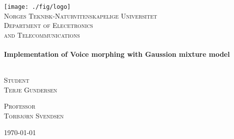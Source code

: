 \begin{titlepage}
 
\begin{center}
 
 
\texttt{[image: ./fig/logo]}\\[1cm]
 
\textsc{\LARGE Norges Teknisk-Naturvitenskapelige Universitet}\\[1.5cm]
 
\textsc{\large Department of Elecetronics \\ and Telecommunications }\\[0.5cm]
 
 
\HRule \\[0.4cm]
{ \huge \bfseries Implementation of Voice morphing with Gaussion mixture model}\\[0.4cm]

\HRule \\[1.5cm]
 
\begin{minipage}{0.45\textwidth}
	\begin{flushleft} \large
		\textsc{Student \\ Terje Gundersen}
	\end{flushleft}
\end{minipage}
\begin{minipage}{0.45\textwidth}
	\begin{flushright} \large
		\textsc{Professor \\ Torbjørn Svendsen}
	\end{flushright}
\end{minipage}
 
\vfill
 
{\large \today}
 
\end{center}
 
\end{titlepage}
